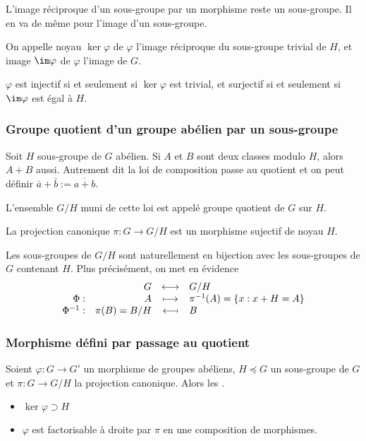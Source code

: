 \documentclass[a4paper,11pt,twocolumn]{article}
\begin{document}
       L'image réciproque d'un sous-groupe par un morphisme reste un sous-groupe. Il en va de même pour l'image d'un sous-groupe.

       On appelle noyau $\ker\varphi$ de $\varphi$ l'image réciproque du sous-groupe trivial de $H$, et image $\im\varphi$ de $\varphi$ l'image de $G$.

       $\varphi$ est injectif si et seulement si $\ker\varphi$ est trivial, et surjectif si et seulement si $\im\varphi$ est égal à $H$.

    \subsubsection{Groupe quotient d'un groupe abélien par un sous-groupe}

       Soit $H$ sous-groupe de $G$ abélien. Si $A$ et $B$ sont deux classes modulo $H$, alors $A+B$ aussi. Autrement dit la loi de composition passe au quotient et on peut définir $\bar{a}+\bar{b} := \overline{a+b}$.

       L'ensemble $G/H$ muni de cette loi est appelé groupe quotient de $G$ sur $H$.

       La projection canonique $\pi:G\rightarrow G/H$ est un morphisme sujectif de noyau $H$.

       Les sous-groupes de $G/H$ sont naturellement en bijection avec les sous-groupes de $G$ contenant $H$. Plus précisément, on met en évidence
      \[\begin{array}{rrcl}
          {}&G&\longleftrightarrow&G/H\\
          \Phi:&A&\longmapsto&\pi^{-1}(A) = \{x: x+H = A\}\\
          \Phi^{-1}:&\pi(B) = B/H&\reflectbox{$\longmapsto$}&B
      \end{array}\]

    \subsubsection{Morphisme défini par passage au quotient}

       Soient $\varphi:G\rightarrow G'$ un morphisme de groupes abéliens, $H\preccurlyeq G$ un sous-groupe de $G$ et $\pi:G\rightarrow G/H$ la projection canonique. Alors les \Asse{}.
      \begin{itemize}
        \item $\ker\varphi\supset H$
        \item $\varphi$ est factorisable à droite par $\pi$ en une composition de morphismes.
      \end{itemize}
\end{document}
